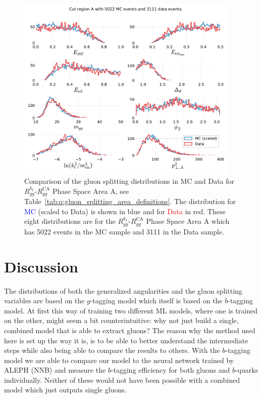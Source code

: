 \begin{figure}[h!]
  \centerfloat
  \includegraphics[width=0.95\textwidth, trim=0 0 0 0, clip]{figures/quarks/gtag-R_kt_CA_histograms-down_sample=1.00-ML_vars=vertex-selection=b-ejet_min=4-n_iter_RS_lgb=99-n_iter_RS_xgb=9-cdot_cut=0.90-version=19-njet=4.pdf}
  \caption[Gluon Splitting Distribution Comparison in MC and Data for $R_{gg}^{k_t}$-$R_{gg}^\mathrm{CA}$ Phase Space Area A]
          {Comparison of the gluon splitting distributions in MC and Data for $R_{gg}^{k_t}$-$R_{gg}^\mathrm{CA}$ Phase Space Area A, see Table~\ref{tab:q:gluon_splitting_area_definitions}. The distribution for \textcolor{blue}{MC} (scaled to Data) is shown in blue and for \textcolor{red}{Data} in red. These eight distributions are for the $R_{gg}^{k_t}$-$R_{gg}^\mathrm{CA}$ Phase Space Area A which has \num{5022} events in the MC sample and \num{3111} in the Data sample. } 
  \label{fig:q:R_kt_CA_cut_A_non_appendix}
\end{figure}

\section{Discussion}
\label{sec:q:discussion}

The distributions of both the generalized angularities and the gluon splitting variables are based on the $g$-tagging model which itself is based on the $b$-tagging model. At first this way of training two different ML models, where one is trained on the other, might seem a bit counterintuitive: why not just build a single, combined model that is able to extract gluons? The reason why the method used here is set up the way it is, is to be able to better understand the intermediate steps while also being able to compare the results to others. With the $b$-tagging model we are able to compare our model to the neural network trained by ALEPH (NNB) and measure the $b$-tagging efficiency for both gluons and $b$-quarks individually. Neither of these would not have been possible with a combined model which just outputs single gluons. 

